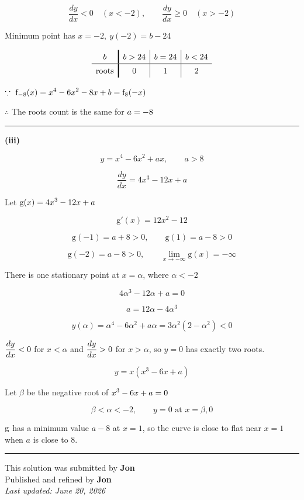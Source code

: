\documentclass[12pt]{article}
\begin{document}
$$\frac{dy}{dx}<0\quad (x<-2),\qquad \frac{dy}{dx}\geq 0\quad(x>-2)$$

Minimum point has $x=-2,\ y(-2)=b-24$

$$
\renewcommand{\arraystretch}{1.4}
\begin{array}{c!{\vrule width 1.2pt}c|c|c}
b & b>24 & b=24 & b<24\\
\hline
\rule[-4pt]{0pt}{14pt}
\text{roots} & 0 & 1 & 2
\end{array}
$$

$\because\ \displaystyle \mathrm{f}_{-8}(x)=x^4-6x^2-8x+b=\mathrm{f}_{8}(-x)$

$\therefore$ The roots count is the same for $\displaystyle a=-8$

\bigskip\hrule\bigskip

\textbf{(iii)}

$$y=x^4-6x^2+ax,\qquad a>8$$

$$\frac{dy}{dx}=4x^3-12x+a$$

Let $\displaystyle \mathrm{g}(x)=4x^3-12x+a$

$$\mathrm{g}'(x)=12x^2-12$$

$$\mathrm{g}(-1)=a+8>0,\qquad \mathrm{g}(1)=a-8>0$$

$$\mathrm{g}(-2)=a-8>0,\qquad \lim_{x\to-\infty}\mathrm{g}(x)=-\infty$$

There is one stationary point at $x=\alpha$, where $\alpha<-2$

$$4\alpha^3-12\alpha+a=0$$

$$a=12\alpha-4\alpha^3$$

$$y(\alpha)=\alpha^4-6\alpha^2+a\alpha
=3\alpha^2(2-\alpha^2)<0$$

$\displaystyle\frac{dy}{dx}<0$ for $x<\alpha$ and $\displaystyle\frac{dy}{dx}>0$ for $x>\alpha$, so $y=0$ has exactly two roots.

$$y=x(x^3-6x+a)$$

Let $\beta$ be the negative root of $\displaystyle x^3-6x+a=0$

$$\beta<\alpha<-2,\qquad y=0\text{ at }x=\beta,0$$

$\displaystyle\mathrm{g}$ has a minimum value $a-8$ at $x=1$, so the curve is close to flat near $x=1$ when $a$ is close to $8$.

\begin{center}
\end{center}

\bigskip
\hrule
\begin{center}
    This solution was submitted by \textbf{Jon}\\[4pt]
    Published and refined by \textbf{Jon}\\[8pt]
    \textit{Last updated: June 20, 2026}
\end{center}
\end{document}
